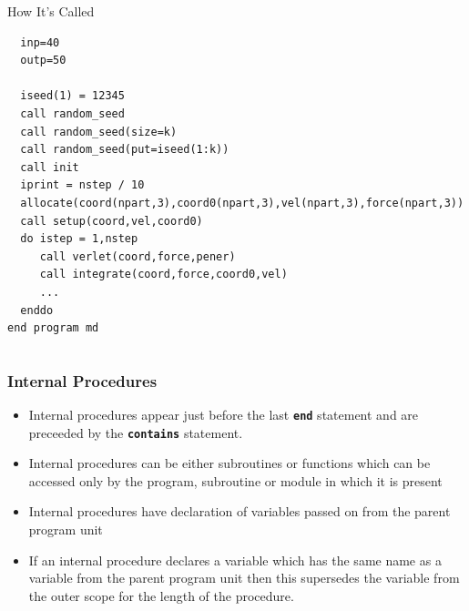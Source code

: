 \documentclass[slidestop,mathserif,compress,xcolor=svgnames]{beamer}
\newenvironment{eblock}[0]
{
\begin{beamerboxesrounded}[upper=uppercol2,lower=lowercol2,shadow=true]}
{\end{beamerboxesrounded}}
\begin{document}
\begin{frame}
{\begin{columns}
\begin{eblock}{How It's Called}
\begin{verbatim}
  inp=40
  outp=50
  
  iseed(1) = 12345
  call random_seed
  call random_seed(size=k)
  call random_seed(put=iseed(1:k))
  call init
  iprint = nstep / 10
  allocate(coord(npart,3),coord0(npart,3),vel(npart,3),force(npart,3))
  call setup(coord,vel,coord0)   
  do istep = 1,nstep
     call verlet(coord,force,pener)
     call integrate(coord,force,coord0,vel)
     ...
  enddo
end program md

       \end{verbatim}
      \end{eblock}
    \end{columns}
  }
\end{frame}

\begin{frame}
  \frametitle{\small Internal Procedures}
  \begin{itemize}
    \item Internal procedures appear just before the last \textbf{\texttt{end}} statement and are preceeded by the \textbf{\texttt{contains}} statement.
    \item Internal procedures can be either subroutines or functions which can be accessed only by the program, subroutine or module in which it is present
    \item Internal procedures have declaration of variables passed on from the parent program unit
    \item If an internal procedure declares a variable which has the same name as a variable from the parent program unit then this supersedes the variable from the outer scope for the length of the procedure.
  \end{itemize}
\end{frame}
\end{document}
